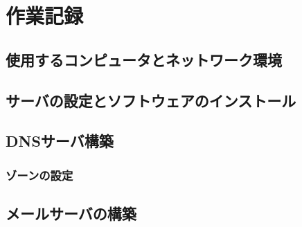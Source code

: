 \section{作業記録}
\subsection{使用するコンピュータとネットワーク環境}
\subsection{サーバの設定とソフトウェアのインストール}
\subsection{DNSサーバ構築}
\subsubsection{ゾーンの設定}\label{chap:ゾーンの設定}
\subsection{メールサーバの構築}